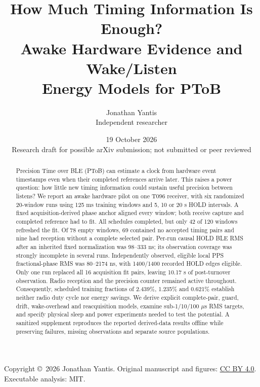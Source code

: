 \documentclass[11pt,letterpaper]{article}
\begin{document}
\title{\vspace{-1.2em}How Much Timing Information Is Enough?\\Awake Hardware Evidence and Wake/Listen\\Energy Models for PToB}
\author{Jonathan Yantis\\\small Independent researcher}
\date{19 October 2026\\\small Research draft for possible arXiv submission; not submitted or peer reviewed}
\maketitle
\begin{abstract}
Precision Time over BLE (PToB) can estimate a clock from hardware event timestamps even when their completed references arrive later. This raises a power question: how little new timing information could sustain useful precision between listens? We report an awake hardware pilot on one T096 receiver, with six randomized 20-window runs using 125 ms training windows and 5, 10 or 20 s HOLD intervals. A fixed acquisition-derived phase anchor aligned every window; both receive capture and completed reference had to fit. All schedules completed, but only 42 of 120 windows refreshed the fit. Of 78 empty windows, 69 contained no accepted timing pairs and nine had reception without a complete selected pair. Per-run causal HOLD BLE RMS after an inherited fixed normalization was 98--333 ns; its observation coverage was strongly incomplete in several runs. Independently observed, eligible local PPS fractional-phase RMS was 80--2174 ns, with 1400/1400 recorded HOLD edges eligible. Only one run replaced all 16 acquisition fit pairs, leaving 10.17 s of post-turnover observation. Radio reception and the precision counter remained active throughout. Consequently, scheduled training fractions of 2.439\%, 1.235\% and 0.621\% establish neither radio duty cycle nor energy savings. We derive explicit complete-pair, guard, drift, wake-overhead and reacquisition models, examine sub-1/10/100 $\mu$s RMS targets, and specify physical sleep and power experiments needed to test the potential. A sanitized supplement reproduces the reported derived-data results offline while preserving failures, missing observations and separate source populations.
\end{abstract}
\noindent\small Copyright \copyright\ 2026 Jonathan Yantis. Original manuscript and figures: \href{https://creativecommons.org/licenses/by/4.0/}{CC BY 4.0}. Executable analysis: MIT.\normalsize
\end{document}
